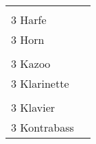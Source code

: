\documentclass{article}\usepackage[ngerman]{babel}\usepackage{geometry}\usepackage{lmodern}
\begin{document}
\begin{table}[p]
  \begin{tabular}{ll}    \hspace{-2em}    \fbox{\begin{minipage}[t][6cm][t]{8cm}
        \fontsize{45}{54} \selectfont
        \phantom{ }\\
      \phantom{ }3 Harfe    \end{minipage}}
    &
\fbox{\begin{minipage}[t][6cm][t]{8cm}
        \fontsize{45}{54} \selectfont
        \phantom{ }\\
        \phantom{ } 3 Horn      \end{minipage}}\\    \hspace{-2em}    \fbox{\begin{minipage}[t][6cm][t]{8cm}
        \fontsize{45}{54} \selectfont
        \phantom{ }\\
      \phantom{ }3 Kazoo    \end{minipage}}
    &
\fbox{\begin{minipage}[t][6cm][t]{8cm}
        \fontsize{45}{54} \selectfont
        \phantom{ }\\
        \phantom{ } 3 Klarinette      \end{minipage}}\\    \hspace{-2em}    \fbox{\begin{minipage}[t][6cm][t]{8cm}
        \fontsize{45}{54} \selectfont
        \phantom{ }\\
      \phantom{ }3 Klavier    \end{minipage}}
    &
\fbox{\begin{minipage}[t][6cm][t]{8cm}
        \fontsize{45}{54} \selectfont
        \phantom{ }\\
        \phantom{ } 3 Kontrabass      \end{minipage}}\\\end{tabular}
\end{table}
\end{document}
